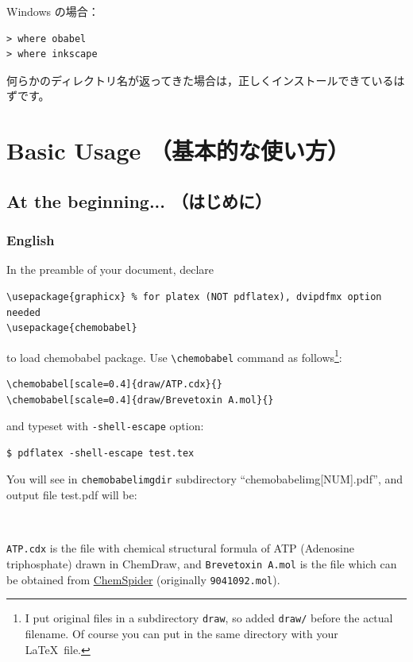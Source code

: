\documentclass[12pt]{jsarticle}
\begin{document}
Windows の場合：
\begin{verbatim}
> where obabel
> where inkscape
\end{verbatim}

何らかのディレクトリ名が返ってきた場合は，正しくインストールできているはずです。

\clearpage

\section{Basic Usage （基本的な使い方）} \label{basic}

\subsection{At the beginning... （はじめに）}

\subsubsection{English}
In the preamble of your document, declare
\begin{verbatim}
\usepackage{graphicx} % for platex (NOT pdflatex), dvipdfmx option needed
\usepackage{chemobabel}
\end{verbatim}
to load \textsf{chemobabel} package. Use \verb|\chemobabel| command as follows\footnote{I put original files in a subdirectory \texttt{draw}, so added \texttt{draw/} before the actual filename. Of course you can put in the same directory with your \LaTeX\ file.}:
\begin{verbatim}
\chemobabel[scale=0.4]{draw/ATP.cdx}{}
\chemobabel[scale=0.4]{draw/Brevetoxin A.mol}{}
\end{verbatim}
and typeset with \verb|-shell-escape| option:
\begin{verbatim}
$ pdflatex -shell-escape test.tex
\end{verbatim}
You will see in \verb|chemobabelimgdir| subdirectory ``chemobabelimg[NUM].pdf'', and output file test.pdf will be:
\begin{figure}[h]
  \centering
   \\
\end{figure}

\verb|ATP.cdx| is the file with chemical structural formula of ATP (Adenosine triphosphate) drawn in ChemDraw, and \verb|Brevetoxin A.mol| is the file which can be obtained from \href{http://www.chemspider.com/}{ChemSpider} (originally \verb|9041092.mol|).
\end{document}
